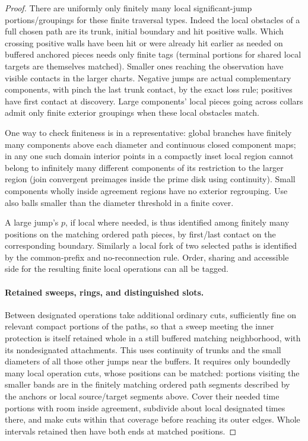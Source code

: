 \begin{proof}
There are uniformly only finitely many local significant-jump portions/groupings
for these finite traversal types. Indeed the local obstacles of a full chosen path are its trunk, initial
boundary and hit positive walls. Which crossing positive walls have been hit or were already hit earlier as
needed on buffered anchored pieces needs only finite tags (terminal portions for shared local targets are
themselves matched). Smaller ones reaching the observation have visible contacts in the larger charts.
Negative jumps are actual complementary components, with pinch the last trunk contact, by the exact loss
rule; positives have first contact at discovery. Large components' local pieces going across collars admit
only finite exterior groupings when these local obstacles match.

One way to check finiteness is in a
representative: global branches have finitely many components above each diameter and continuous closed
component maps; in any one such domain interior points in a compactly inset local region cannot belong to
infinitely many different components of its restriction to the larger region (join convergent preimages
inside the prime disk using continuity). Small components wholly inside agreement regions have no exterior
regrouping. Use also balls smaller than the diameter threshold in a finite cover.

A large jump's \(p\), if
local where needed, is thus identified among finitely many positions on the matching ordered path pieces, by
first/last contact on the corresponding boundary. Similarly a local fork of two selected paths is identified
by the common-prefix and no-reconnection rule. Order, sharing and accessible side for the resulting finite
local operations can all be tagged.

\paragraph{Retained sweeps, rings, and distinguished slots.}

Between designated operations take additional ordinary cuts, sufficiently fine on relevant compact portions
of the paths, so that a sweep meeting the inner protection is itself retained whole in a still buffered
matching neighborhood, with its nondesignated attachments. This uses continuity of trunks and the small
diameters of all those other jumps near the buffers. It requires only boundedly many local operation cuts,
whose positions can be matched: portions visiting the smaller bands are in the finitely matching ordered
path segments described by the anchors or local source/target segments above. Cover their needed time
portions with room inside agreement, subdivide about local designated times there, and make cuts within that
coverage before reaching its outer edges. Whole intervals retained then have both ends at matched positions.


\end{proof}
